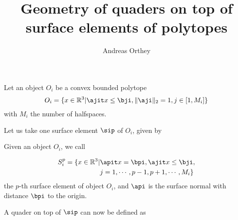 \documentclass{article}
\def\R{\ensuremath{\mathbb{R}}}
\begin{document}
 

\title{Geometry of quaders on top of surface elements of polytopes} 
\author{Andreas Orthey}
\date{}
\maketitle


\begin{definition}
        Let an object $O_i$ be a convex bounded polytope 
        \begin{equation}
                \begin{aligned}
                        O_i=\{x\in \R^3| \ajit x\leq \bji, \|\aji\|_2=1,
                        j\in[1,M_i]\}
                \end{aligned}
        \end{equation}
        with $M_i$ the number of halfspaces.
\end{definition}

Let us take one surface element $\sip$ of $O_i$, given by
\begin{definition}
        Given an object $O_i$, we call
        
        \begin{equation}
                \begin{aligned}
                        S_i^p = \{x \in \R^3|&\apit x = \bpi, \ajit x \leq \bji, \\
                                             &j=1,\cdots,p-1,p+1,\cdots,M_i\}
                \end{aligned}
        \end{equation}
        the $p$-th surface element of object $O_i$, and $\api$ is the
        surface normal with distance $\bpi$ to the origin.
\end{definition}

A quader on top of $\sip$ can now be defined as
\end{document}

